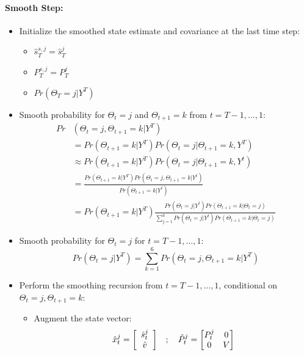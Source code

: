 \documentclass[12pt,letter,leqno]{article}
\theoremstyle{asn}
\theoremstyle{lem}
\theoremstyle{slem}
\theoremstyle{prop}
\theoremstyle{appprop}
\theoremstyle{rem}
\theoremstyle{defn}
\begin{document}
\paragraph{Smooth Step:}
\begin{itemize}
\item Initialize the smoothed state estimate and covariance at the last time step:
\begin{itemize}
\item \( \hat{s}_T^{s,j} = \hat{s}_T^j \)
\item \( P_T^{s,j} = P_T^j \)
\item $Pr(\Theta_T=j|Y^T)$
\end{itemize}

\item Smooth probability for $\Theta_t=j$ and $\Theta_{t+1}=k$ from \(t= T-1,..., 1 \):
\begin{align*}
Pr&(\Theta_t=j,\Theta_{t+1}=k|Y^T) \\
&=Pr(\Theta_{t+1}=k|Y^T)Pr(\Theta_t=j|\Theta_{t+1}=k,Y^T) \\
&\approx Pr(\Theta_{t+1}=k|Y^T)Pr(\Theta_t=j|\Theta_{t+1}=k,Y^t) \\
&=\frac{Pr(\Theta_{t+1}=k|Y^T)Pr(\Theta_t=j,\Theta_{t+1}=k|Y^t)}{Pr(\Theta_{t+1}=k|Y^t)}\\
&=Pr(\Theta_{t+1}=k|Y^T)\frac{Pr(\Theta_t=j|Y^t)Pr(\Theta_{t+1}=k|\Theta_t=j)}{\sum_{j=1}^6 Pr(\Theta_t=j|Y^t)Pr(\Theta_{t+1}=k|\Theta_t=j)}
\end{align*}

\item Smooth probability for $\Theta_t=j$ for \(t= T-1,..., 1 \):
\begin{equation*}
Pr(\Theta_t=j|Y^T) = \sum_{k=1}^6 Pr(\Theta_t=j,\Theta_{t+1}=k|Y^T)
\end{equation*}

\item Perform the smoothing recursion from \(t= T-1,..., 1 \), conditional on $\Theta_t=j,\Theta_{t+1}=k$:
\begin{itemize}
\item Augment the state vector:
\begin{equation*}
  \begin{split}
    \hat{x}_{t}^j =  \left[
                    \begin{array}[c]{c}%
                        \hat{s}_{t}^j\\
                        \hat{v}
                    \end{array} \right]  &   
    \end{split}
    ;\quad
    \begin{split}
    \tilde{P}^j_{t} = 
            \begin{bmatrix}
                P_{t}^j & 0 \\
                  0 & V
            \end{bmatrix}
    \end{split}
\end{equation*}


\end{itemize}
\end{itemize}
\end{document}
